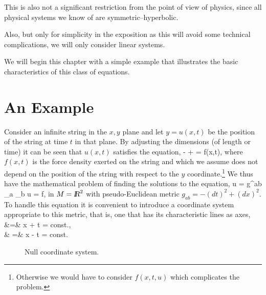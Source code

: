 This is also not a significant restriction from the point of view
of physics, since all physical systems we know of
are symmetric--hyperbolic.

Also, but only for simplicity in the exposition as
this will avoid some technical complications, we will only consider
linear systems.

We will begin this chapter with a simple example that illustrates the
basic characteristics of this class of equations.

\section{An Example}

Consider an infinite string in the $x,y$ plane and let $y = u(x,t)$ be the position
of the string at time $t$ in that plane.
By adjusting the dimensions (of length or time) it can be seen that
$u(x,t)$ satisfies the equation,
\beq
 - +  = f(x,t),
\label{1)}
\eeq
where $f(x,t)$ is the force density exerted on the
string and which
we assume does not depend on the position of the string with respect to the
$y$ coordinate.\footnote{Otherwise we would have to consider $f(x,t,u)$ which
complicates the problem.}
We thus have the mathematical problem of finding the solutions to the equation,
\beq 
\Box u = g^{ab} \na_a \na_b u = f,
\eeq
in $M = \mbox{\sl {l$\!\!\!\;\:\!$R}}^2$ with pseudo-Euclidean metric $g_{ab} = -(dt)^2 + (dx)^2.$
To handle this equation it is convenient to introduce a coordinate system
appropriate to this metric, that is, one that has its characteristic lines as axes,
\beq{}
\xi &=& x + t = const.,\\
\eta& =& x - t = const.
\earr
\eeq

\espa 
\begin{figure}[htbp]
  \begin{center}
    \caption{Null coordinate system.}
    \label{fig:13_1}
  \end{center}
\end{figure}

